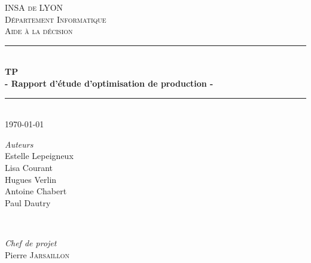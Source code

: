 \documentclass[12pt]{article}
\begin{document}
\begin{titlepage}

\newcommand{\HRule}{\rule{\linewidth}{0.5mm}} %

\center %
 

\vspace*{1cm}

\textsc{\LARGE INSA de LYON}\\[1.5cm] 
\textsc{\Large D\'epartement Informatique}\\[0.5cm] 
\textsc{\large Aide à la décision}\\[0.5cm] %


\HRule \\[0.4cm]
{ \huge \bfseries TP}\\[0.1cm]
{\large \bfseries - Rapport d'étude d'optimisation de production -} 
\HRule \\[1.5cm]
 

{\large \today}\\[2cm] %
 

\begin{minipage}{0.4\textwidth}
\begin{center} \large
\emph{Auteurs} \\
Estelle Lepeigneux\\
Lisa Courant\\
Hugues Verlin\\
Antoine Chabert\\
Paul Dautry\\
\end{center}
\end{minipage}
~
\begin{minipage}{0.4\textwidth}
\begin{center} \large
\emph{Chef de projet} \\
Pierre \textsc{Jarsaillon}
\end{center}
\end{minipage}\\[7cm]


\end{titlepage}
\end{document}
